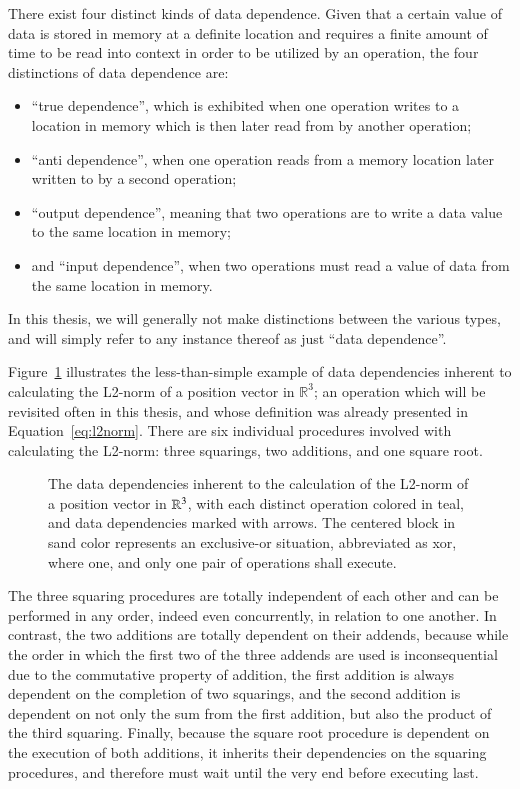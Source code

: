 There exist four distinct kinds of data dependence. Given that a certain value of data is stored in memory at a definite location and requires a finite amount of time to be read into context in order to be utilized by an operation, the four distinctions of data dependence are:
%
\begin{itemize}
	\item ``true dependence'', which is exhibited when one operation writes to a location in memory which is then later read from by another operation;
	\item ``anti dependence'', when one operation reads from a memory location later written to by a second operation;
	\item ``output dependence'', meaning that two operations are to write a data value to the same location in memory;
	\item and ``input dependence'', when two operations must read a value of data from the same location in memory.
\end{itemize}

In this thesis, we will generally not make distinctions between the various types, and will simply refer to any instance thereof as just ``data dependence''.

Figure~\ref{fig:dataDependencyOfL2Norm} illustrates the less-than-simple example of data dependencies inherent to calculating the L2-norm of a position vector in $\mathbb{R}^{3}$; an operation which will be revisited often in this thesis, and whose definition was already presented in Equation~\ref{eq:l2norm}. There are six individual procedures involved with calculating the L2-norm: three squarings, two additions, and one square root.

\begin{figure}[ht]
	
	{\caption[Data Dependencies in the L2-norm Calculation]{The data dependencies inherent to the calculation of the L2-norm of a position vector in $\mathbb{R}^{3}$, with each distinct operation colored in teal, and data dependencies marked with arrows. The centered block in sand color represents an exclusive-or situation, abbreviated as xor, where one, and only one pair of operations shall execute.}\label{fig:dataDependencyOfL2Norm}}
\end{figure}

The three squaring procedures are totally independent of each other and can be performed in any order, indeed even concurrently, in relation to one another. In contrast, the two additions are totally dependent on their addends, because while the order in which the first two of the three addends are used is inconsequential due to the commutative property of addition, the first addition is always dependent on the completion of two squarings, and the second addition is dependent on not only the sum from the first addition, but also the product of the third squaring. Finally, because the square root procedure is dependent on the execution of both additions, it inherits their dependencies on the squaring procedures, and therefore must wait until the very end before executing last.

